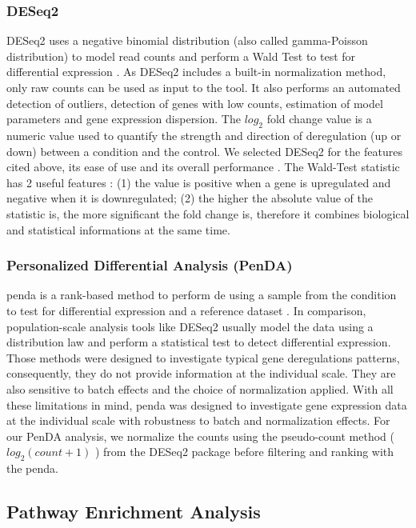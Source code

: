\subsubsection{DESeq2}

DESeq2 uses a negative binomial distribution (also called gamma-Poisson distribution) to model read counts and perform a Wald Test to test for differential expression \cite*{Love2014}.
As DESeq2 includes a built-in normalization method, only raw counts can be used as input to the tool.
It also performs an automated detection of outliers, detection of genes with low counts, estimation of model parameters and gene expression dispersion.
The $log_2$ fold change value is a numeric value used to quantify the strength and direction of deregulation (up or down) between a condition and the control.
We selected DESeq2 for the features cited above, its ease of use and its overall performance \cite*{Love2014}.
The Wald-Test statistic has 2 useful features : (1) the value is positive when a gene is upregulated and negative when it is downregulated; (2) the higher the absolute value of the statistic is, the more significant the fold change is, therefore it combines biological and statistical informations at the same time.

\subsubsection{ Personalized Differential Analysis (PenDA)}

\acrshort{penda} is a rank-based method to perform \acrshort{de} using a sample from the condition to test for differential expression and a reference dataset \cite*{Richard2020}.
In comparison, population-scale analysis tools like DESeq2 usually model the data using a distribution law and perform a statistical test to detect differential expression.
Those methods were designed to investigate typical gene deregulations patterns, consequently, they do not provide information at the individual scale.
They are also sensitive to batch effects and the choice of normalization applied.
With all these limitations in mind, \acrshort{penda} was designed to investigate gene expression data at the individual scale with robustness to batch and normalization effects.
For our PenDA analysis, we normalize the counts using the pseudo-count method ( $log_2(count + 1)$ ) from the DESeq2 package before filtering and ranking with the \acrshort{penda}.

\subsection{Pathway Enrichment Analysis}

